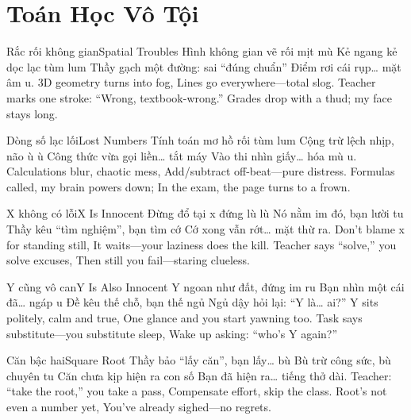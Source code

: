 \chapter{Toán Học Vô Tội}


\begin{tutuyetbox}{Rắc rối không gian}{Spatial Troubles}
Hình không gian vẽ rối mịt mù
Kẻ ngang kẻ dọc lạc tùm lum
Thầy gạch một đường: sai “đúng chuẩn”
Điểm rơi cái rụp… mặt âm u.
\tcblower
3D geometry turns into fog,
Lines go everywhere—total slog.
Teacher marks one stroke: “Wrong, textbook-wrong.”
Grades drop with a thud; my face stays long.
\end{tutuyetbox}

\begin{tutuyetbox}{Dòng số lạc lối}{Lost Numbers}
Tính toán mơ hồ rối tùm lum
Cộng trừ lệch nhịp, não ù ù
Công thức vừa gọi liền… tắt máy
Vào thi nhìn giấy… hóa mù u.
\tcblower
Calculations blur, chaotic mess,
Add/subtract off-beat—pure distress.
Formulas called, my brain powers down;
In the exam, the page turns to a frown.
\end{tutuyetbox}


\begin{tutuyetbox}{X không có lỗi}{X Is Innocent}
Đừng đổ tại x đứng lù lù
Nó nằm im đó, bạn lười tu
Thầy kêu “tìm nghiệm”, bạn tìm cớ
Cớ xong vẫn rớt… mặt thừ ra.
\tcblower
Don’t blame x for standing still,
It waits—your laziness does the kill.
Teacher says “solve,” you solve excuses,
Then still you fail—staring clueless.
\end{tutuyetbox}

\begin{tutuyetbox}{Y cũng vô can}{Y Is Also Innocent}
Y ngoan như đất, đứng im ru
Bạn nhìn một cái đã… ngáp u
Đề kêu thế chỗ, bạn thế ngủ
Ngủ dậy hỏi lại: “Y là… ai?”
\tcblower
Y sits politely, calm and true,
One glance and you start yawning too.
Task says substitute—you substitute sleep,
Wake up asking: “who’s Y again?”
\end{tutuyetbox}

\begin{tutuyetbox}{Căn bậc hai}{Square Root}
Thầy bảo “lấy căn”, bạn lấy… bù
Bù trừ công sức, bù chuyên tu
Căn chưa kịp hiện ra con số
Bạn đã hiện ra… tiếng thở dài.
\tcblower
Teacher: “take the root,” you take a pass,
Compensate effort, skip the class.
Root’s not even a number yet,
You’ve already sighed—no regrets.
\end{tutuyetbox}

